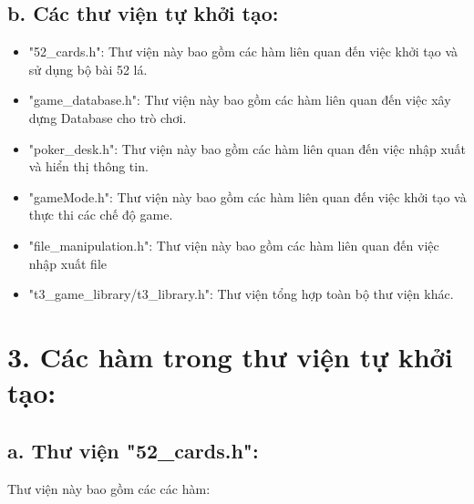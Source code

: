 \documentclass{article}
\begin{document}
\subsection{b. Các thư viện tự khởi tạo: }
\begin{itemize}
    \item "52\_cards.h": Thư viện này bao gồm các hàm liên quan đến việc khởi tạo và sử dụng bộ bài 52 lá.
    \item "game\_database.h": Thư viện này bao gồm các hàm liên quan đến việc xây dựng Database cho trò chơi.
    \item "poker\_desk.h": Thư viện này bao gồm các hàm liên quan đến việc nhập xuất và hiển thị thông tin.
    \item "gameMode.h": Thư viện này bao gồm các hàm liên quan đến việc khởi tạo và thực thi các chế độ game.
    \item "file\_manipulation.h": Thư viện này bao gồm các hàm liên quan đến việc nhập xuất file
    \item "t3\_game\_library/t3\_library.h": Thư viện tổng hợp toàn bộ thư viện khác.

\end{itemize}


\section{3. Các hàm trong thư viện tự khởi tạo: }
\subsection{a. Thư viện "52\_cards.h": }
Thư viện này bao gồm các các hàm:
\end{document}
